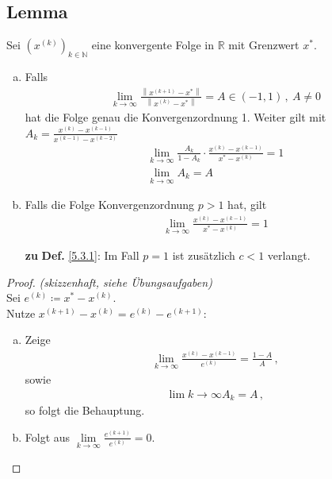\documentclass[ngerman,fontsize=11pt, paper=a4, parskip=half, titlepage=true, toc=bib]{scrbook}
\newcommand{\R}{\mathds{R}}
\newcommand{\N}{\mathds{N}}
\newcommand{\nn}[1]{\left\| #1 \right\|}
\begin{document}
	\subsection{Lemma} \label{5.3.5}
	Sei $(x^{(k)})_{k\in\N}$ eine konvergente Folge in $\R$ mit Grenzwert $x^{*}$.
	\begin{enumerate}[a)]
		\item Falls 
		\begin{gather}
			\lim\limits_{k\rightarrow \infty}\frac{\nn{x^{(k+1)}-x^{*}}}{\nn{x^{(k)}-x^{*}}}=
			A\in (-1,1)\, ,~ A\neq 0
			\label{V.3.1}
		\end{gather}
		hat die Folge genau die Konvergenzordnung 1.
		Weiter gilt mit $A_k=\frac{x^{(k)}-x^{(k-1)}}{x^{(k-1)}-x^{(k-2)}}$
				\begin{gather}
					\lim\limits_{k\rightarrow \infty}\frac{A_k}{1-A_k}\cdot 
					\frac{x^{(k)}-x^{(k-1)}}{x^{*}-x^{(k)}}=1 
					\label{V.3.2}
					\\ \nonumber
					\lim\limits_{k\rightarrow\infty}A_k=A
				\end{gather}
		\item Falls die Folge Konvergenzordnung $p>1$ hat, gilt
		\begin{gather}
			\lim\limits_{k\rightarrow\infty}\frac{x^{(k)}-x^{(k-1)}}{x^{*}-x^{(k)}}=1
			\label{V.3.3}
		\end{gather}
		\item[\textbf{zu}]\textbf{Def.} \ref{5.3.1}:  Im Fall $p=1$ ist zusätzlich $c<1 $ verlangt.
	\end{enumerate}
	
	\begin{proof}
		\textit{(skizzenhaft, siehe Übungsaufgaben)}\\
		 Sei $e^{(k)}\coloneqq x^{*}-x^{(k)}$.\\
		 Nutze $x^{(k+1)}-x^{(k)} = e^{(k)}-e^{(k+1)}$:
		 \begin{enumerate}[a)]
		 	\item Zeige 
			 	\begin{gather*} 
				 	\lim\limits_{k\rightarrow\infty}\frac{x^{(k)}-x^{(k-1)}}{e^{(k)}} = \frac{1-A}{A}\, ,
				 \end{gather*}
				 sowie
				 \begin{gather*}
				 	\lim\limits{k\rightarrow \infty}A_k = A \, ,
				 \end{gather*}
				 so folgt die Behauptung.
			\item Folgt aus $\lim\limits_{k\rightarrow\infty} \frac{e^{(k+1)}}{e^{(k)}} =0$.
		 \end{enumerate}
	\end{proof}
\end{document}
